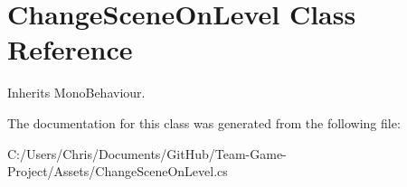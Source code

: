 \hypertarget{class_change_scene_on_level}{}\section{Change\+Scene\+On\+Level Class Reference}
\label{class_change_scene_on_level}


Inherits Mono\+Behaviour.



The documentation for this class was generated from the following file\+:\begin{DoxyCompactItemize}
\item 
C\+:/\+Users/\+Chris/\+Documents/\+Git\+Hub/\+Team-\/\+Game-\/\+Project/\+Assets/Change\+Scene\+On\+Level.\+cs\end{DoxyCompactItemize}
